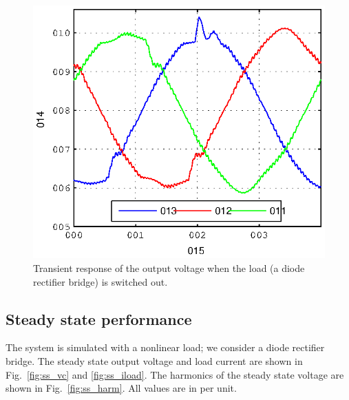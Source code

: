 \documentclass[conference,10pt]{IEEEtran}
\begin{document}
\begin{figure}[!h]
\centering

\includegraphics{fig/transient_vCf}
\caption{Transient response of the output voltage when the load (a diode rectifier bridge) is switched out.}
\label{fig:trans_vc}
\end{figure}


\subsection{Steady state performance}
The system is simulated with a nonlinear load; we consider a diode rectifier bridge. The steady state output voltage and load current are shown in Fig.~\ref{fig:ss_vc} and \ref{fig:ss_iload}. The harmonics of the steady state voltage are shown in Fig.~\ref{fig:ss_harm}. All values are in per unit.
\end{document}
